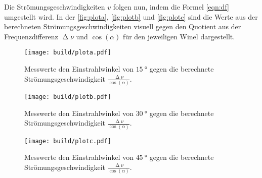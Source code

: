 \noindent
Die Strömungsgeschwindigkeiten $v$ folgen nun, indem die Formel \eqref{eqn:df} umgestellt wird. In der \autoref{fig:plota}, \autoref{fig:plotb} und \autoref{fig:plotc} sind die Werte aus der 
berechneten Strömungsgeschwindigkeiten visuell gegen den Quotient aus der Frequenzdifferenz $\upDelta \nu$ und $\cos(\alpha)$ für den jeweiligen Winel dargestellt.
\begin{figure}[H]
  \centering
  \texttt{[image: build/plota.pdf]}
  \caption{Messwerte den Einstrahlwinkel von $\SI{15}{\degree}$ gegen die berechnete Strömungsgeschwindigkeit $\frac{\upDelta\nu}{\cos(\alpha)}$.}
  \label{fig:plota}
\end{figure}

\begin{figure}[H]
  \centering
  \texttt{[image: build/plotb.pdf]}
  \caption{Messwerte den Einstrahlwinkel von $\SI{30}{\degree}$ gegen die berechnete Strömungsgeschwindigkeit $\frac{\upDelta\nu}{\cos(\alpha)}$.}
  \label{fig:plotb}
\end{figure}

\begin{figure}[H]
  \centering
  \texttt{[image: build/plotc.pdf]}
  \caption{Messwerte den Einstrahlwinkel von $\SI{45}{\degree}$ gegen die berechnete Strömungsgeschwindigkeit $\frac{\upDelta\nu}{\cos(\alpha)}$.}
  \label{fig:plotc}
\end{figure}

